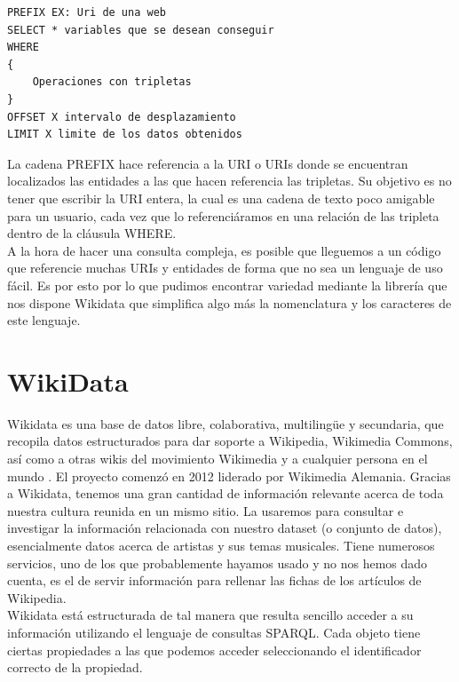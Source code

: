 \begin{lstlisting}[language=SPARQL]
PREFIX EX: Uri de una web
SELECT * variables que se desean conseguir
WHERE
{
	Operaciones con tripletas
}
OFFSET X intervalo de desplazamiento
LIMIT X limite de los datos obtenidos
\end{lstlisting}
\bigskip

La cadena PREFIX hace referencia a la URI o URIs donde se encuentran localizados las entidades a las que hacen referencia las tripletas. Su objetivo es no tener que escribir la URI entera, la cual es una cadena de texto poco amigable para un usuario, cada vez que lo referenciáramos en una relación de las tripleta dentro de la cláusula WHERE.\\

A la hora de hacer una consulta compleja, es posible que lleguemos a un código que referencie muchas URIs y entidades de forma que no sea un lenguaje de uso fácil. Es por esto por lo que pudimos encontrar variedad mediante la librería que nos dispone Wikidata que simplifica algo más la nomenclatura y los caracteres de este lenguaje.\\

\section{WikiData}

Wikidata es una base de datos libre, colaborativa, multilingüe y secundaria, que recopila datos estructurados para dar soporte a Wikipedia, Wikimedia Commons, así como a otras wikis del movimiento Wikimedia y a cualquier persona en el mundo \cite{wikidataIntro}. El proyecto comenzó en 2012 liderado por Wikimedia Alemania. Gracias a Wikidata, tenemos una gran cantidad de información relevante acerca de toda nuestra cultura reunida en un mismo sitio. La usaremos para consultar e investigar la información relacionada con nuestro dataset (o conjunto de datos), esencialmente datos acerca de artistas y sus temas musicales. Tiene numerosos servicios, uno de los que probablemente hayamos usado y no nos hemos dado cuenta, es el de servir información para rellenar las fichas de los artículos de Wikipedia.\\

Wikidata está estructurada de tal manera que resulta sencillo acceder a su información utilizando el lenguaje de consultas SPARQL. Cada objeto tiene ciertas propiedades a las que podemos acceder seleccionando el identificador correcto de la propiedad.\\

